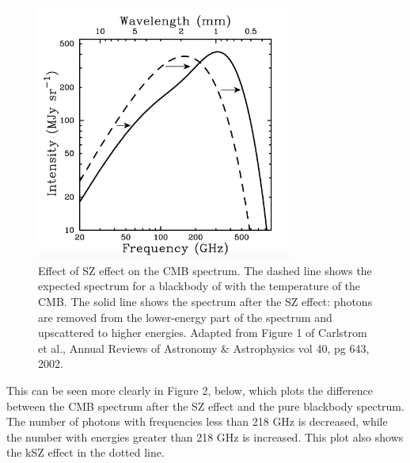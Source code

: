 \documentclass{article}
\begin{document}
\begin{figure}
    \centering
    \includegraphics[width=0.75\textwidth]{figures/CarlstromFig1.png}
    \caption{Effect of SZ effect on the CMB spectrum. The dashed line shows the expected spectrum for a blackbody of with the temperature of the CMB. The solid line shows the spectrum after the SZ effect: photons are removed from the lower-energy part of the spectrum and upscattered to higher energies. Adapted from Figure 1 of Carlstrom et al., Annual Reviews of Astronomy \& Astrophysics vol 40, pg 643, 2002.}
    \label{fig:carlstrom1}
\end{figure}

This can be seen more clearly in Figure 2, below, which plots the difference between the CMB spectrum after the SZ effect and the pure blackbody spectrum. The number of photons with frequencies less than 218 GHz is decreased, while the number with energies greater than 218 GHz is increased. This plot also shows the kSZ effect in the dotted line.
\end{document}
